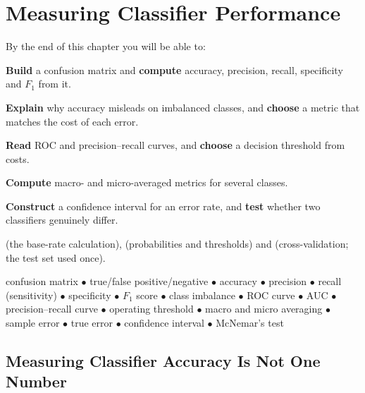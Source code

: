 \chapter{Measuring Classifier Performance}\label{ch:evaluation}

\begin{outcomes}
By the end of this chapter you will be able to:
\begin{tight}
  \item \textbf{Build} a confusion matrix and \textbf{compute} accuracy,
        precision, recall, specificity and $F_1$ from it.
  \item \textbf{Explain} why accuracy misleads on imbalanced classes, and
        \textbf{choose} a metric that matches the cost of each error.
  \item \textbf{Read} ROC and precision--recall curves, and \textbf{choose} a
        decision threshold from costs.
  \item \textbf{Compute} macro- and micro-averaged metrics for several classes.
  \item \textbf{Construct} a confidence interval for an error rate, and
        \textbf{test} whether two classifiers genuinely differ.
\end{tight}
\end{outcomes}

\begin{prereq}
 (the base-rate calculation),  (probabilities and
thresholds) and  (cross-validation; the test set used
once).
\end{prereq}

\begin{keyterms}
confusion matrix $\bullet$ true/false positive/negative $\bullet$ accuracy
$\bullet$ precision $\bullet$ recall (sensitivity) $\bullet$ specificity
$\bullet$ $F_1$ score $\bullet$ class imbalance $\bullet$ ROC curve $\bullet$
AUC $\bullet$ precision--recall curve $\bullet$ operating threshold $\bullet$
macro and micro averaging $\bullet$ sample error $\bullet$ true error
$\bullet$ confidence interval $\bullet$ McNemar's test
\end{keyterms}

\section{Measuring Classifier Accuracy Is Not One Number}

